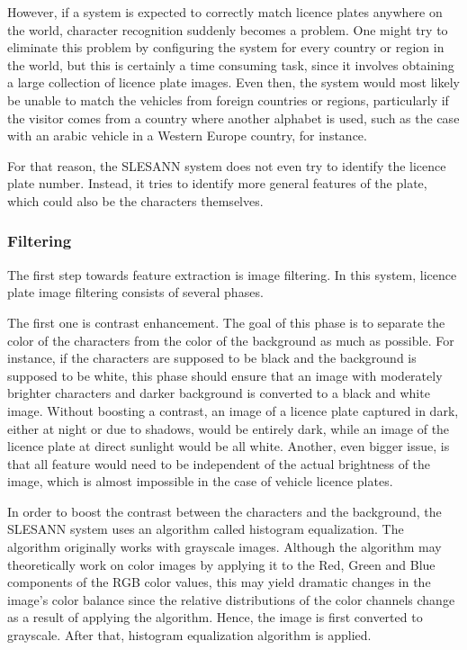 \documentclass[times, utf8, zavrsni]{fer}
\begin{document}
However, if a system is expected to correctly match licence plates anywhere on
the world, character recognition suddenly becomes a problem. One might try to
eliminate this problem by configuring the system for every country or region in
the world, but this is certainly a time consuming task, since it involves
obtaining a large collection of licence plate images. Even then, the system
would most likely be unable to match the vehicles from foreign countries or
regions, particularly if the visitor comes from a country where another alphabet
is used, such as the case with an arabic vehicle in a Western Europe
country, for instance.

For that reason, the SLESANN system does not even try to identify the licence
plate number. Instead, it tries to identify more general features of the
plate, which could also be the characters themselves.

\subsubsection{Filtering}

The first step towards feature extraction is image filtering. In this
system, licence plate image filtering consists of several phases. 

The first one is contrast enhancement. The goal of this phase is to separate the
color of the characters from the color of the background as much as possible.
For instance, if the characters are supposed to be black and the background is
supposed to be white, this phase should ensure that an image with moderately
brighter characters and darker background is converted to a black and white
image. Without boosting a contrast, an image of a licence plate captured in
dark, either at night or due to shadows, would be entirely dark, while an image
of the licence plate at direct sunlight would be all white. Another, even bigger
issue, is that all feature would need to be independent of the actual brightness
of the image, which is almost impossible in the case of vehicle licence plates.

In order to boost the contrast between the characters and the background, the
SLESANN system uses an algorithm called histogram equalization. The algorithm
originally works with grayscale images. Although the algorithm may
theoretically work on color images by applying it to the Red, Green and Blue components of the
RGB color values, this may yield dramatic changes in the image's color balance
since the relative distributions of the color channels change as a result of
applying the algorithm. Hence, the image is first converted to grayscale. After
that, histogram equalization algorithm is applied.
\end{document}
